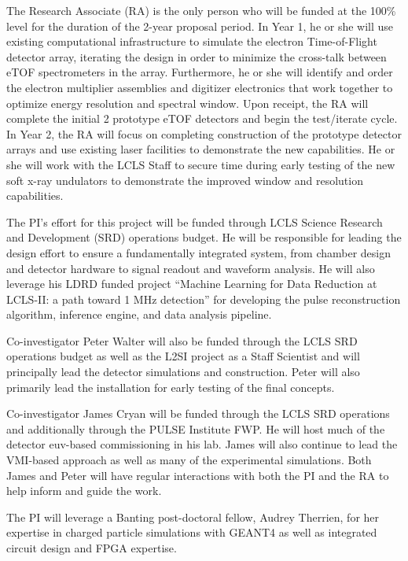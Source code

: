 The Research Associate (RA) is the only person who will be funded at the 100\% level for the duration of the 2-year proposal period.  
In Year 1, he or she will use existing computational infrastructure to simulate the electron Time-of-Flight detector array, iterating the design in order to minimize the cross-talk between eTOF spectrometers in the array.  
Furthermore, he or she will identify and order the electron multiplier assemblies and digitizer electronics that work together to optimize energy resolution and spectral window.  
Upon receipt, the RA will complete the initial 2 prototype eTOF detectors and begin the test/iterate cycle.
In Year 2, the RA will focus on completing construction of the prototype detector arrays and use existing laser facilities to demonstrate the new capabilities.  
He or she will work with the LCLS Staff to secure time during early testing of the new soft x-ray undulators to demonstrate the improved window and resolution capabilities.

The PI's effort for this project will be funded through LCLS Science Research and Development (SRD) operations budget.  
He will be responsible for leading the design effort to ensure a fundamentally integrated system, from chamber design and detector hardware to signal readout and waveform analysis.
He will also leverage his LDRD funded project ``Machine Learning for Data Reduction at LCLS-II: a path toward 1 MHz detection'' for developing the pulse reconstruction algorithm, inference engine, and data analysis pipeline.

Co-investigator Peter Walter will also be funded through the LCLS SRD operations budget as well as the L2SI project as a Staff Scientist and will principally lead the detector simulations and construction.
Peter will also primarily lead the installation for early testing of the final concepts.

Co-investigator James Cryan will be funded through the LCLS SRD operations and additionally through the PULSE Institute FWP.
He will host much of the detector euv-based commissioning in his lab.
James will also continue to lead the VMI-based approach as well as many of the experimental simulations.
Both James and Peter will have regular interactions with both the PI and the RA to help inform and guide the work.

The PI will leverage a Banting post-doctoral fellow, Audrey Therrien, for her expertise in charged particle simulations with GEANT4 as well as integrated circuit design and FPGA expertise.


